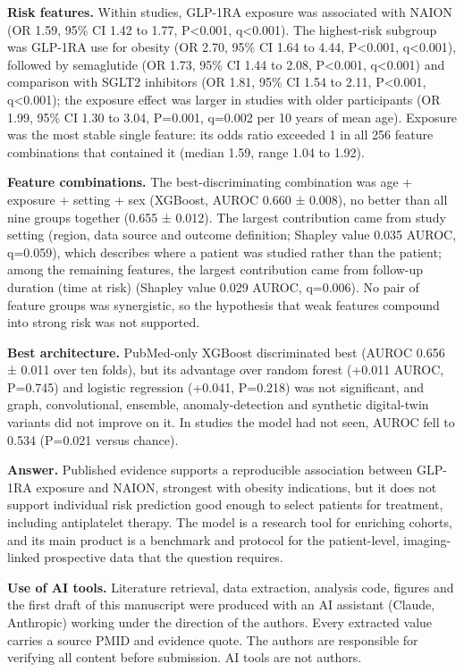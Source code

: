 \documentclass[
  11pt,
]{article}
\begin{document}
\textbf{Risk features.} Within studies, GLP-1RA exposure was associated
with NAION (OR 1.59, 95\% CI 1.42 to 1.77, P\textless0.001,
q\textless0.001). The highest-risk subgroup was GLP-1RA use for obesity
(OR 2.70, 95\% CI 1.64 to 4.44, P\textless0.001, q\textless0.001),
followed by semaglutide (OR 1.73, 95\% CI 1.44 to 2.08, P\textless0.001,
q\textless0.001) and comparison with SGLT2 inhibitors (OR 1.81, 95\% CI
1.54 to 2.11, P\textless0.001, q\textless0.001); the exposure effect was
larger in studies with older participants (OR 1.99, 95\% CI 1.30 to
3.04, P=0.001, q=0.002 per 10 years of mean age). Exposure was the most
stable single feature: its odds ratio exceeded 1 in all 256 feature
combinations that contained it (median 1.59, range 1.04 to 1.92).

\textbf{Feature combinations.} The best-discriminating combination was
age + exposure + setting + sex (XGBoost, AUROC 0.660 ± 0.008), no better
than all nine groups together (0.655 ± 0.012). The largest contribution
came from study setting (region, data source and outcome definition;
Shapley value 0.035 AUROC, q=0.059), which describes where a patient was
studied rather than the patient; among the remaining features, the
largest contribution came from follow-up duration (time at risk)
(Shapley value 0.029 AUROC, q=0.006). No pair of feature groups was
synergistic, so the hypothesis that weak features compound into strong
risk was not supported.

\textbf{Best architecture.} PubMed-only XGBoost discriminated best
(AUROC 0.656 ± 0.011 over ten folds), but its advantage over random
forest (+0.011 AUROC, P=0.745) and logistic regression (+0.041, P=0.218)
was not significant, and graph, convolutional, ensemble,
anomaly-detection and synthetic digital-twin variants did not improve on
it. In studies the model had not seen, AUROC fell to 0.534 (P=0.021
versus chance).

\textbf{Answer.} Published evidence supports a reproducible association
between GLP-1RA exposure and NAION, strongest with obesity indications,
but it does not support individual risk prediction good enough to select
patients for treatment, including antiplatelet therapy. The model is a
research tool for enriching cohorts, and its main product is a benchmark
and protocol for the patient-level, imaging-linked prospective data that
the question requires.

\textbf{Use of AI tools.} Literature retrieval, data extraction,
analysis code, figures and the first draft of this manuscript were
produced with an AI assistant (Claude, Anthropic) working under the
direction of the authors. Every extracted value carries a source PMID
and evidence quote. The authors are responsible for verifying all
content before submission. AI tools are not authors.
\end{document}
